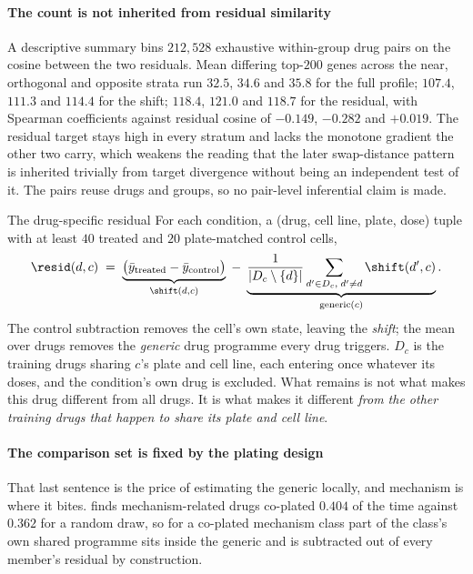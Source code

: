 \paragraph{The count is not inherited from residual similarity} A descriptive
summary bins $212{,}528$ exhaustive within-group drug pairs on the cosine between
the two residuals. Mean differing top-$200$ genes across the near,
orthogonal and opposite strata run $32.5$, $34.6$ and $35.8$ for the full
profile; $107.4$, $111.3$ and $114.4$ for the shift; $118.4$, $121.0$ and
$118.7$ for the residual, with Spearman coefficients against residual cosine of
$-0.149$, $-0.282$ and $+0.019$. The residual target stays high in every stratum
and lacks the monotone gradient the other two carry, which weakens the reading
that the later swap-distance pattern is inherited trivially from target
divergence without being an independent test of it. The pairs reuse drugs and
groups, so no pair-level inferential claim is made.

\begin{defn}{The drug-specific residual}
For each condition, a (drug, cell line, plate, dose) tuple with at least $40$
treated and $20$ plate-matched control cells,
\begin{equation}
 \resid(d,c) \;=\; \underbrace{\big(\bar{y}_{\textrm{treated}} - \bar{y}_{\textrm{control}}\big)}_{\shift(d,c)}
 \;-\; \underbrace{\frac{1}{|D_c \setminus \{d\}|}\sum_{d' \in D_c,\; d' \neq d} \shift(d',c)}_{\textrm{generic}(c)} .
\end{equation}
The control subtraction removes the cell's own state, leaving the \emph{shift};
the mean over drugs removes the \emph{generic} drug programme every drug
triggers. $D_c$ is the training drugs sharing $c$'s plate and cell line, each
entering once whatever its doses, and the condition's own drug is excluded.
What remains is not what makes this drug different from all drugs. It
is what makes it different \emph{from the other training drugs that happen to
share its plate and cell line}.
\end{defn}

\paragraph{The comparison set is fixed by the plating design} That last sentence
is the price of estimating the generic locally, and mechanism is where it bites.
 finds mechanism-related drugs co-plated $0.404$ of the time
against $0.362$ for a random draw, so for a co-plated mechanism class part of the
class's own shared programme sits inside the generic and is subtracted out of
every member's residual by construction.

